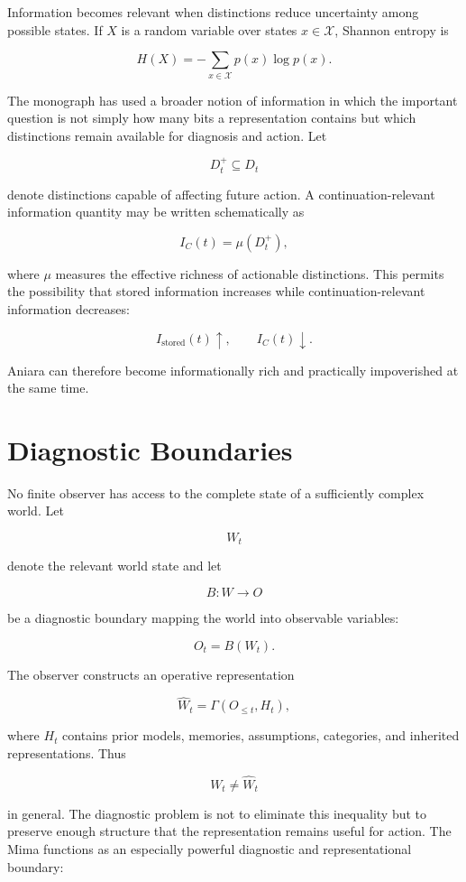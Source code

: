 \documentclass[11pt,oneside]{book}
\theoremstyle{definition}
\theoremstyle{remark}
\begin{document}
Information becomes relevant when distinctions reduce uncertainty among possible states. If \(X\) is
a random variable over states \(x\in\mathcal{X}\), Shannon entropy is

\[
H(X) = -\sum_{x\in\mathcal{X}} p(x)\log p(x).
\]

The monograph has used a broader notion of information in which the important question is not simply
how many bits a representation contains but which distinctions remain available for diagnosis and
action. Let

\[
D_t^{+}\subseteq D_t
\]

denote distinctions capable of affecting future action. A continuation-relevant information quantity
may be written schematically as

\[
I_C(t)=\mu(D_t^{+}),
\]

where \(\mu\) measures the effective richness of actionable distinctions. This permits the
possibility that stored information increases while continuation-relevant information decreases:

\[
I_{\mathrm{stored}}(t)\uparrow, \qquad I_C(t)\downarrow.
\]

Aniara can therefore become informationally rich and practically impoverished at the same time.

\section{Diagnostic Boundaries}

No finite observer has access to the complete state of a sufficiently complex world. Let

\[
W_t
\]

denote the relevant world state and let

\[
B:W\rightarrow O
\]

be a diagnostic boundary mapping the world into observable variables:

\[
O_t=B(W_t).
\]

The observer constructs an operative representation

\[
\widehat{W}_t = \Gamma(O_{\leq t},H_t),
\]

where \(H_t\) contains prior models, memories, assumptions, categories, and inherited
representations. Thus

\[
W_t\neq\widehat{W}_t
\]

in general. The diagnostic problem is not to eliminate this inequality but to preserve enough
structure that the representation remains useful for action. The Mima functions as an especially
powerful diagnostic and representational boundary:
\end{document}
